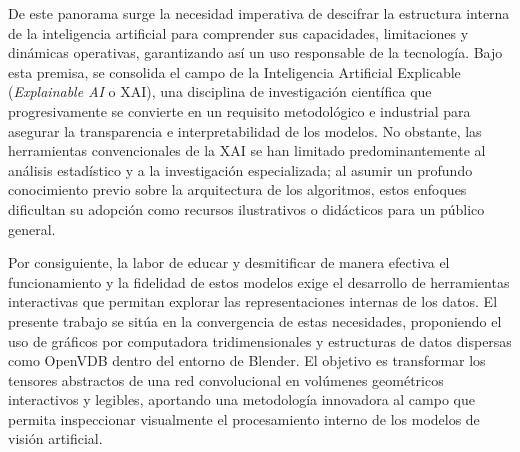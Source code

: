 De este panorama surge la necesidad imperativa de descifrar la estructura interna de la inteligencia artificial para comprender sus capacidades,
limitaciones y dinámicas operativas, garantizando así un uso responsable de la tecnología. Bajo esta premisa, se consolida el campo de la Inteligencia Artificial
Explicable (\textit{Explainable AI} o XAI), una disciplina de investigación científica que progresivamente se convierte en
un requisito metodológico e industrial para asegurar la transparencia e interpretabilidad de los modelos. No obstante,
las herramientas convencionales de la XAI se han limitado predominantemente al análisis estadístico y a la investigación
especializada; al asumir un profundo conocimiento previo sobre la arquitectura de los algoritmos, estos enfoques dificultan su adopción como
recursos ilustrativos o didácticos para un público general.
\medskip

Por consiguiente, la labor de educar y desmitificar de manera efectiva el funcionamiento y la fidelidad de estos 
modelos exige el desarrollo de herramientas interactivas que permitan explorar las representaciones internas de los 
datos. El presente trabajo se sitúa en la convergencia de estas necesidades, proponiendo el uso
de gráficos por computadora tridimensionales y estructuras de datos dispersas como OpenVDB dentro del entorno de 
Blender. El objetivo es transformar los tensores abstractos de una red convolucional en volúmenes geométricos 
interactivos y legibles, aportando una metodología innovadora al campo que permita inspeccionar visualmente 
el procesamiento interno de los modelos de visión artificial.